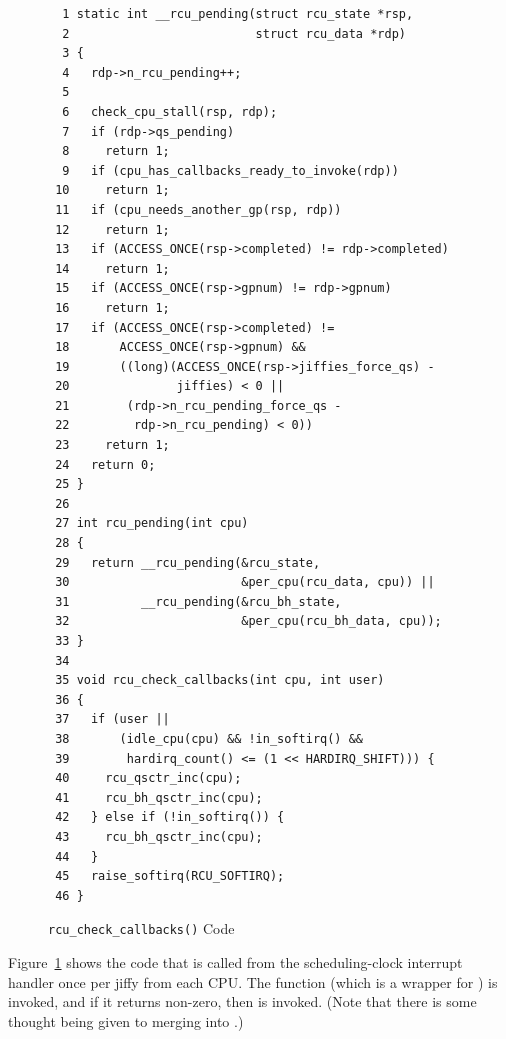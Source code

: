 \begin{figure}[tbp]
{ \scriptsize
\begin{verbatim}
  1 static int __rcu_pending(struct rcu_state *rsp,
  2                          struct rcu_data *rdp)
  3 {
  4   rdp->n_rcu_pending++;
  5
  6   check_cpu_stall(rsp, rdp);
  7   if (rdp->qs_pending)
  8     return 1;
  9   if (cpu_has_callbacks_ready_to_invoke(rdp))
 10     return 1;
 11   if (cpu_needs_another_gp(rsp, rdp))
 12     return 1;
 13   if (ACCESS_ONCE(rsp->completed) != rdp->completed)
 14     return 1;
 15   if (ACCESS_ONCE(rsp->gpnum) != rdp->gpnum)
 16     return 1;
 17   if (ACCESS_ONCE(rsp->completed) !=
 18       ACCESS_ONCE(rsp->gpnum) &&
 19       ((long)(ACCESS_ONCE(rsp->jiffies_force_qs) -
 20               jiffies) < 0 ||
 21        (rdp->n_rcu_pending_force_qs -
 22         rdp->n_rcu_pending) < 0))
 23     return 1;
 24   return 0;
 25 }
 26
 27 int rcu_pending(int cpu)
 28 {
 29   return __rcu_pending(&rcu_state,
 30                        &per_cpu(rcu_data, cpu)) ||
 31          __rcu_pending(&rcu_bh_state,
 32                        &per_cpu(rcu_bh_data, cpu));
 33 }
 34
 35 void rcu_check_callbacks(int cpu, int user)
 36 {
 37   if (user ||
 38       (idle_cpu(cpu) && !in_softirq() &&
 39        hardirq_count() <= (1 << HARDIRQ_SHIFT))) {
 40     rcu_qsctr_inc(cpu);
 41     rcu_bh_qsctr_inc(cpu);
 42   } else if (!in_softirq()) {
 43     rcu_bh_qsctr_inc(cpu);
 44   }
 45   raise_softirq(RCU_SOFTIRQ);
 46 }
\end{verbatim}
}
\caption{{\tt rcu\_check\_callbacks()} Code}
\label{fig:app:rcuimpl:rcutreewt:Code for rcutree rcu-check-callbacks}
\end{figure}

Figure~\ref{fig:app:rcuimpl:rcutreewt:Code for rcutree rcu-check-callbacks}
shows the code that is called from the scheduling-clock interrupt
handler once per jiffy from each CPU.
The  function (which is a wrapper for )
is invoked, and if it returns non-zero, then 
is invoked.
(Note that there is some thought being given to merging 
into .)

